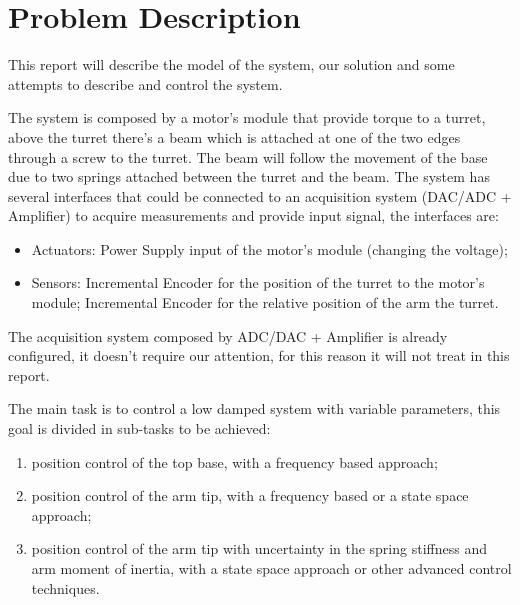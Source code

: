 \chapter{Problem Description}
\label{cha:problem_description}

    This report will describe the model of the system, our solution and some attempts to describe and control the system.

    The system is composed by a motor's module that provide torque to a turret, above the turret there's a beam which is attached at one of the two edges through a screw to the turret. The beam will follow the movement of the base due to two springs attached between the turret and the beam.
    The system has several interfaces that could be connected to an acquisition system (DAC/ADC + Amplifier) to acquire measurements and provide input signal, the interfaces are:
    \begin{itemize}
        \item Actuators:
            \subitem Power Supply input of the motor's module (changing the voltage);
        \item Sensors:
            \subitem Incremental Encoder for the position of the turret \wrt to the motor's module;
            \subitem Incremental Encoder for the relative position of the arm \wrt the turret.
    \end{itemize}
    The acquisition system composed by ADC/DAC + Amplifier is already configured, it doesn't require our attention, for this reason it will not treat in this report.

    The main task is to control a low damped system with variable parameters, this goal is divided in sub-tasks to be achieved:
    \begin{enumerate}
        \item position control of the top base, with a frequency based approach;
        \item position control of the arm tip, with a frequency based or a state space approach;
        \item position control of the arm tip with uncertainty in the spring stiffness and arm moment of inertia, with a state space approach or other advanced control techniques.
    \end{enumerate}






